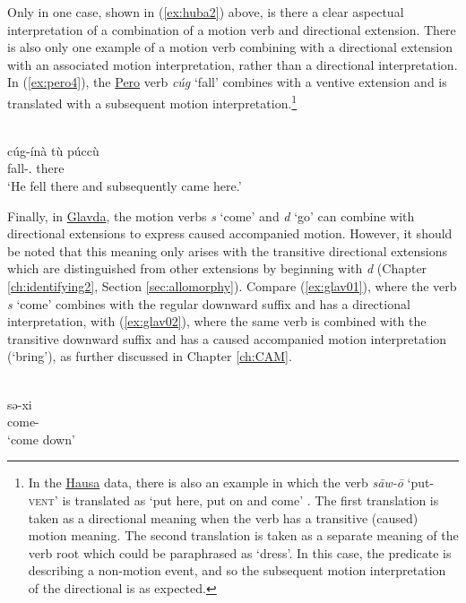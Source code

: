 Only in one case, shown in (\ref{ex:huba2}) above, is there a clear aspectual interpretation of a combination of a motion verb and directional extension. There is also only one example of a motion verb combining with a directional extension with an associated motion interpretation, rather than a directional interpretation. In (\ref{ex:pero4}), the \hyperref[pero]{Pero} verb \textit{cúg} `fall' combines with a ventive extension and is translated with a subsequent motion interpretation.\footnote{In the \hyperref[haus]{Hausa} data, there is also an example in which the verb \textit{sāw-ō} `put-\textsc{vent}' is translated as `put here, put on and come' \citep[662]{newmanHausaLanguageEncyclopedic2000}. The first translation is taken as a directional meaning when the verb has a transitive (caused) motion meaning. The second translation is taken as a separate meaning of the verb root which could be paraphrased as `dress'. In this case, the predicate is describing a non-motion event, and so the subsequent motion interpretation of the directional is as expected.} 

\ea\label{ex:pero4}
 \\
\gll  cúg-ínà	tù	púccù \\
fall-.	 there	 \\
\glt `He fell there and subsequently came here.'
\z 

Finally, in \hyperref[glav]{Glavda}, the motion verbs \textit{s} `come' and \textit{d} `go' can combine with directional extensions to express caused accompanied motion. However, it should be noted that this meaning only arises with the transitive directional extensions which are distinguished from other extensions by beginning with \textit{d} (Chapter \ref{ch:identifying2}, Section \ref{sec:allomorphy}). Compare (\ref{ex:glav01}), where the verb \textit{s} `come' combines with the regular downward suffix and has a directional interpretation, with (\ref{ex:glav02}), where the same verb is combined with the transitive downward suffix and has a caused accompanied motion interpretation (`bring'), as further discussed in Chapter \ref{ch:CAM}. 

\ea\label{ex:glav01}
 \\
\gll sə-xi	\\
come- \\
\glt `come down'

